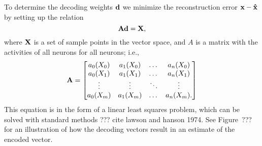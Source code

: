 To determine the decoding weights $\mathbf{d}$
we minimize the reconstruction error
$\mathbf{x} - \mathbf{\hat{x}}$
by setting up the relation
\begin{equation*}
  \mathbf{Ad} = \mathbf{X},
\end{equation*}
where $\mathbf{X}$ is a set of sample points
in the vector space,
and $A$ is a matrix with the activities
of all neurons for all neurons;
i.e.,
\begin{equation*}
  \label{A}
  \mathbf{A} =
  \begin{bmatrix}
    a_0(X_0) & a_1(X_0) & \dots  & a_n(X_0) \\
    a_0(X_1) & a_1(X_1) & \dots  & a_n(X_1) \\
    \vdots & \vdots & \ddots & \vdots \\
    a_0(X_m) & a_1(X_m) & \dots  & a_n(X_m).
  \end{bmatrix}
\end{equation*}
This equation is in the form
of a linear least squares problem,
which can be solved with standard methods
??? cite lawson and hanson 1974.
See Figure~??? for an illustration
of how the decoding vectors
result in an estimate of the encoded vector.


